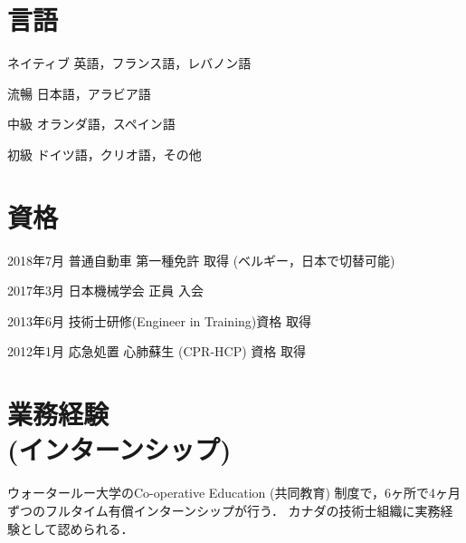 \documentclass[10pt, a4paper]{article}
\begin{document}
\section{言語}
\begin{lonelist}
\item[ネイティブ] 英語，フランス語，レバノン語
\item[流暢] 日本語，アラビア語
\item[中級] オランダ語，スペイン語
\item[初級] ドイツ語，クリオ語，その他
\end{lonelist}

\section{資格}
\begin{lonelist}
\item[2018年7月] 普通自動車 第一種免許 取得 (ベルギー，日本で切替可能)
\item[2017年3月] 日本機械学会 正員 入会
\item[2013年6月] 技術士研修(Engineer in Training)資格 取得
\item[2012年1月] 応急処置 心肺蘇生 (CPR-HCP) 資格 取得
\end{lonelist}

\section{業務経験\\(インターンシップ)}
ウォータールー大学のCo-operative Education (共同教育) 制度で，6ヶ所で4ヶ月ずつのフルタイム有償インターンシップが行う．
カナダの技術士組織に実務経験として認められる．
\end{document}
